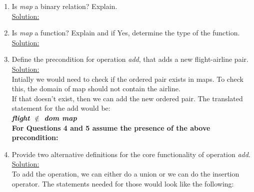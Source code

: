 \begin{enumerate}
  \item Is \emph{map} a binary relation? Explain.\\
  \noindent\underline{Solution:}\\
  \item Is \emph{map} a function? Explain and if Yes, determine the type of the function.\\
  \noindent\underline{Solution:}\\
  \item Define the precondition for operation \emph{add}, that adds a new flight-airline pair.\\
  \noindent\underline{Solution:}\\ Intially we would need to check if the ordered pair exists in maps. To check this, the domain of map should not contain the airline.\\
  If that doesn't exist, then we can add the new ordered pair. The translated statement for the add would be:\\
  \textbf{\emph{flight $\notin$ dom map}}\\
  \textbf{For Questions 4 and 5 assume the presence of the above precondition:}\\
  \item Provide two alternative definitions for the core functionality of operation \emph{add}.\\
  \noindent\underline{Solution:}\\ To add the operation, we can either do a union or we can do the insertion operator. The statements needed for those would look like the following:\
\end{enumerate}

